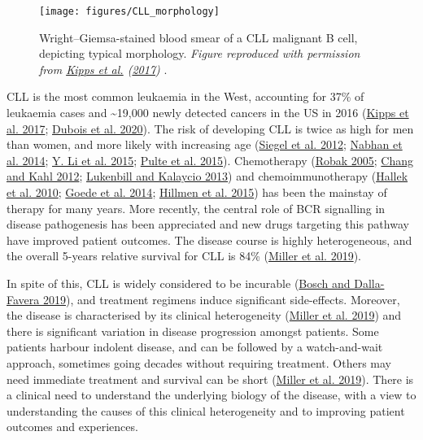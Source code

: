 \documentclass[11pt, a4paper, twosided]{book}
\begin{document}
\begin{figure}

{\centering \texttt{[image: figures/CLL\_morphology]} 

}

\caption{Wright--Giemsa-stained blood smear of a CLL malignant B cell, depicting typical morphology. \emph{Figure reproduced with permission from \protect\hyperlink{ref-Kipps2017}{Kipps et al.} (\protect\hyperlink{ref-Kipps2017}{2017}) }.}\label{fig:CLLmorphology}
\end{figure}
CLL is the most common leukaemia in the West, accounting for 37\% of leukaemia cases and \textasciitilde19,000 newly detected cancers in the US in 2016 (\protect\hyperlink{ref-Kipps2017}{Kipps et al. 2017}; \protect\hyperlink{ref-Dubois2020}{Dubois et al. 2020}). The risk of developing CLL is twice as high for men than women, and more likely with increasing age (\protect\hyperlink{ref-Siegel2012}{Siegel et al. 2012}; \protect\hyperlink{ref-Nabhan2014}{Nabhan et al. 2014}; \protect\hyperlink{ref-Li2015}{Y. Li et al. 2015}; \protect\hyperlink{ref-Pulte2015}{Pulte et al. 2015}). Chemotherapy (\protect\hyperlink{ref-Robak2005}{Robak 2005}; \protect\hyperlink{ref-Chang2012}{Chang and Kahl 2012}; \protect\hyperlink{ref-Lukenbill2013}{Lukenbill and Kalaycio 2013}) and chemoimmunotherapy (\protect\hyperlink{ref-Hallek2010}{Hallek et al. 2010}; \protect\hyperlink{ref-Goede2014}{Goede et al. 2014}; \protect\hyperlink{ref-Hillmen2015}{Hillmen et al. 2015}) has been the mainstay of therapy for many years. More recently, the central role of BCR signalling in disease pathogenesis has been appreciated and new drugs targeting this pathway have improved patient outcomes. The disease course is highly heterogeneous, and the overall 5-years relative survival for CLL is 84\% (\protect\hyperlink{ref-Miller2019}{Miller et al. 2019}).

In spite of this, CLL is widely considered to be incurable (\protect\hyperlink{ref-Bosch2019}{Bosch and Dalla-Favera 2019}), and treatment regimens induce significant side-effects. Moreover, the disease is characterised by its clinical heterogeneity (\protect\hyperlink{ref-Miller2019}{Miller et al. 2019}) and there is significant variation in disease progression amongst patients. Some patients harbour indolent disease, and can be followed by a watch-and-wait approach, sometimes going decades without requiring treatment. Others may need immediate treatment and survival can be short (\protect\hyperlink{ref-Miller2019}{Miller et al. 2019}). There is a clinical need to understand the underlying biology of the disease, with a view to understanding the causes of this clinical heterogeneity and to improving patient outcomes and experiences.
\end{document}
